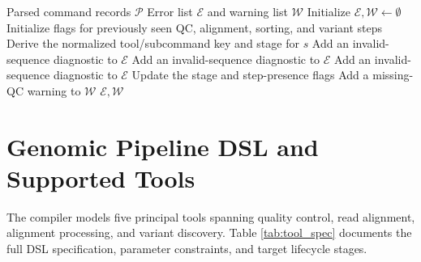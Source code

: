 \documentclass[12pt,a4paper]{article}
\begin{document}
\begin{algorithm}[H]
\caption{High-Level Workflow Validation}
\label{alg:sequence_validator}
\begin{algorithmic}[1]
\Require Parsed command records $\mathcal{P}$
\Ensure Error list $\mathcal{E}$ and warning list $\mathcal{W}$
\State Initialize $\mathcal{E},\mathcal{W} \leftarrow \emptyset$
\State Initialize flags for previously seen QC, alignment, sorting, and variant steps
    \State Derive the normalized tool/subcommand key and stage for $s$
        \State Add an invalid-sequence diagnostic to $\mathcal{E}$
    \EndIf
        \State Add an invalid-sequence diagnostic to $\mathcal{E}$
    \EndIf
        \State Add an invalid-sequence diagnostic to $\mathcal{E}$
    \EndIf
    \State Update the stage and step-presence flags
\EndFor
{}
    \State Add a missing-QC warning to $\mathcal{W}$
\EndIf
\State \Return $\mathcal{E},\mathcal{W}$
\end{algorithmic}
\end{algorithm}

\newpage

\section{Genomic Pipeline DSL and Supported Tools}

The compiler models five principal tools spanning quality control, read alignment, alignment processing, and variant discovery. Table \ref{tab:tool_spec} documents the full DSL specification, parameter constraints, and target lifecycle stages.
\end{document}
